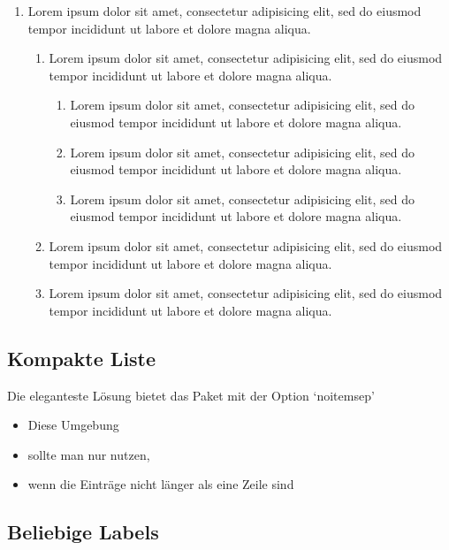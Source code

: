 \begin{enumerate}
   \item Lorem ipsum dolor sit amet, consectetur adipisicing elit, sed do eiusmod tempor incididunt ut labore et dolore magna aliqua.
%
   \begin{enumerate}
      \item Lorem ipsum dolor sit amet, consectetur adipisicing elit, sed do eiusmod tempor incididunt ut labore et dolore magna aliqua.
      \begin{enumerate}
         \item Lorem ipsum dolor sit amet, consectetur adipisicing elit, sed do eiusmod tempor incididunt ut labore et dolore magna aliqua.
         \item Lorem ipsum dolor sit amet, consectetur adipisicing elit, sed do eiusmod tempor incididunt ut labore et dolore magna aliqua.
         \item Lorem ipsum dolor sit amet, consectetur adipisicing elit, sed do eiusmod tempor incididunt ut labore et dolore magna aliqua.
      \end{enumerate}
      \item Lorem ipsum dolor sit amet, consectetur adipisicing elit, sed do eiusmod tempor incididunt ut labore et dolore magna aliqua.
      \item Lorem ipsum dolor sit amet, consectetur adipisicing elit, sed do eiusmod tempor incididunt ut labore et dolore magna aliqua.
   \end{enumerate}
\end{enumerate}

%
\subsection{Kompakte Liste}

Die eleganteste Lösung bietet das Paket  mit der Option `noitemsep'
\begin{itemize}[noitemsep]
\item Diese Umgebung
\item sollte man nur nutzen,
\item wenn die Einträge nicht länger als eine Zeile sind
\end{itemize}

\subsection{Beliebige Labels}


